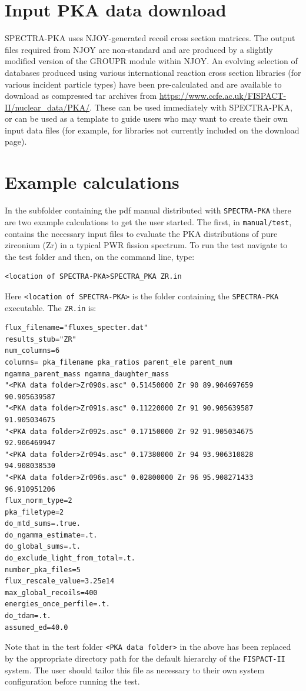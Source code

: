 \documentclass[a4paper]{article}
\begin{document}
\section{Input PKA data download}

SPECTRA-PKA uses NJOY-generated recoil cross section matrices. The output files required from NJOY are non-standard and are produced by a slightly modified version of the GROUPR module within NJOY. An evolving selection of databases produced using various international reaction cross section libraries (for various incident particle types) have been pre-calculated and are available to download as compressed tar archives from \url{https://www.ccfe.ac.uk/FISPACT-II/nuclear_data/PKA/}. These can be used immediately with SPECTRA-PKA, or can be used as a template to guide users who may want to create their own input data files (for example, for libraries not currently included on the download page).



\section{Example calculations}
In the subfolder containing the pdf manual distributed with \texttt{SPECTRA-PKA} there are two example calculations to get the user started. The first, in \texttt{manual/test}, contains the necessary input files to evaluate the PKA distributions of pure zirconium (Zr) in a typical PWR fission spectrum. To run the test navigate to the test folder and then, on the command line, type:
\begin{verbatim}
<location of SPECTRA-PKA>SPECTRA_PKA ZR.in
\end{verbatim}
Here \texttt{<location of SPECTRA-PKA>} is the folder containing the \texttt{SPECTRA-PKA} executable. The \texttt{ZR.in} is:
{\footnotesize
\begin{verbatim}
flux_filename="fluxes_specter.dat"
results_stub="ZR"
num_columns=6
columns= pka_filename pka_ratios parent_ele parent_num ngamma_parent_mass ngamma_daughter_mass
"<PKA data folder>Zr090s.asc" 0.51450000 Zr 90 89.904697659 90.905639587
"<PKA data folder>Zr091s.asc" 0.11220000 Zr 91 90.905639587 91.905034675
"<PKA data folder>Zr092s.asc" 0.17150000 Zr 92 91.905034675 92.906469947
"<PKA data folder>Zr094s.asc" 0.17380000 Zr 94 93.906310828 94.908038530
"<PKA data folder>Zr096s.asc" 0.02800000 Zr 96 95.908271433 96.910951206
flux_norm_type=2
pka_filetype=2
do_mtd_sums=.true.
do_ngamma_estimate=.t.
do_global_sums=.t.
do_exclude_light_from_total=.t.
number_pka_files=5
flux_rescale_value=3.25e14
max_global_recoils=400
energies_once_perfile=.t.
do_tdam=.t.
assumed_ed=40.0
\end{verbatim}}
Note that in the test folder \texttt{<PKA data folder>} in the above has been replaced by the appropriate directory path for the default hierarchy of the \texttt{FISPACT-II} system. The user should tailor this file as necessary to their own system configuration before running the test.
\end{document}
